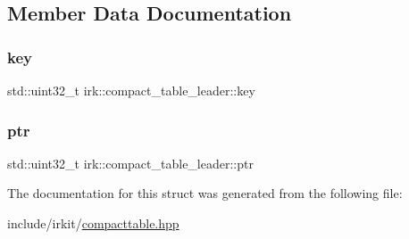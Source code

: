 \subsection{Member Data Documentation}
\mbox{\label{structirk_1_1compact__table__leader_a250e11134b95bb0f559c531a56a548c5}} 
\subsubsection{\texorpdfstring{key}{key}}
{\footnotesize\ttfamily std\+::uint32\+\_\+t irk\+::compact\+\_\+table\+\_\+leader\+::key}

\mbox{\label{structirk_1_1compact__table__leader_aeeb27531e59da3a9be21627117fa0af3}} 
\subsubsection{\texorpdfstring{ptr}{ptr}}
{\footnotesize\ttfamily std\+::uint32\+\_\+t irk\+::compact\+\_\+table\+\_\+leader\+::ptr}



The documentation for this struct was generated from the following file\+:\begin{DoxyCompactItemize}
\item 
include/irkit/\mbox{\hyperlink{compacttable_8hpp}{compacttable.\+hpp}}\end{DoxyCompactItemize}
